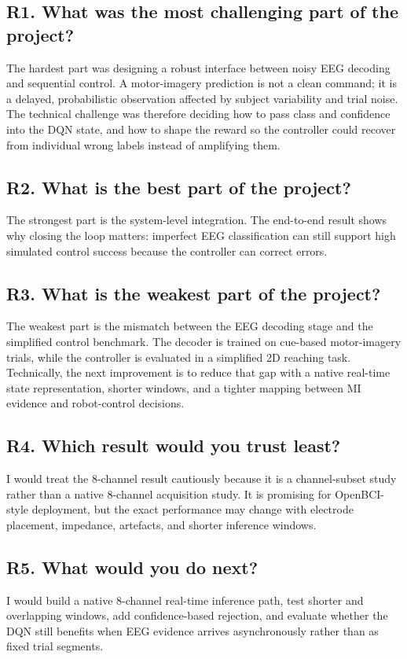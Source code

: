 \documentclass[11pt]{article}
\begin{document}
\subsection*{R1. What was the most challenging part of the project?}
The hardest part was designing a robust interface between noisy EEG decoding and sequential control. A motor-imagery prediction is not a clean command; it is a delayed, probabilistic observation affected by subject variability and trial noise. The technical challenge was therefore deciding how to pass class and confidence into the DQN state, and how to shape the reward so the controller could recover from individual wrong labels instead of amplifying them.


\subsection*{R2. What is the best part of the project?}
The strongest part is the system-level integration. The end-to-end result shows why closing the loop matters: imperfect EEG classification can still support high simulated control success because the controller can correct errors.


\subsection*{R3. What is the weakest part of the project?}
The weakest part is the mismatch between the EEG decoding stage and the simplified control benchmark. The decoder is trained on cue-based motor-imagery trials, while the controller is evaluated in a simplified 2D reaching task. Technically, the next improvement is to reduce that gap with a native real-time state representation, shorter windows, and a tighter mapping between MI evidence and robot-control decisions.


\subsection*{R4. Which result would you trust least?}
I would treat the 8-channel result cautiously because it is a channel-subset study rather than a native 8-channel acquisition study. It is promising for OpenBCI-style deployment, but the exact performance may change with electrode placement, impedance, artefacts, and shorter inference windows.


\subsection*{R5. What would you do next?}
I would build a native 8-channel real-time inference path, test shorter and overlapping windows, add confidence-based rejection, and evaluate whether the DQN still benefits when EEG evidence arrives asynchronously rather than as fixed trial segments.
\end{document}
